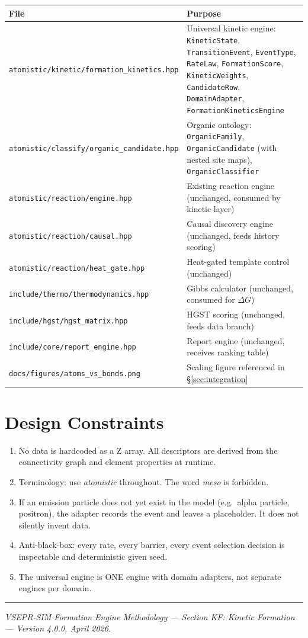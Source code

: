 \documentclass[11pt]{article}
\begin{document}
\begin{center}
\begin{tabular}{lp{7.5cm}}
\toprule
File & Purpose \\
\midrule
\texttt{atomistic/kinetic/formation\_kinetics.hpp} &
  Universal kinetic engine: \texttt{KineticState},
  \texttt{TransitionEvent}, \texttt{EventType},
  \texttt{RateLaw}, \texttt{FormationScore},
  \texttt{KineticWeights}, \texttt{CandidateRow},
  \texttt{DomainAdapter}, \texttt{FormationKineticsEngine} \\
\texttt{atomistic/classify/organic\_candidate.hpp} &
  Organic ontology: \texttt{OrganicFamily},
  \texttt{OrganicCandidate} (with nested site maps),
  \texttt{OrganicClassifier} \\
\texttt{atomistic/reaction/engine.hpp} &
  Existing reaction engine (unchanged, consumed by kinetic layer) \\
\texttt{atomistic/reaction/causal.hpp} &
  Causal discovery engine (unchanged, feeds history scoring) \\
\texttt{atomistic/reaction/heat\_gate.hpp} &
  Heat-gated template control (unchanged) \\
\texttt{include/thermo/thermodynamics.hpp} &
  Gibbs calculator (unchanged, consumed for $\Delta G$) \\
\texttt{include/hgst/hgst\_matrix.hpp} &
  HGST scoring (unchanged, feeds data branch) \\
\texttt{include/core/report\_engine.hpp} &
  Report engine (unchanged, receives ranking table) \\
\texttt{docs/figures/atoms\_vs\_bonds.png} &
  Scaling figure referenced in \S\ref{sec:integration} \\
\bottomrule
\end{tabular}
\end{center}

\section{Design Constraints}
\label{sec:constraints}

\begin{enumerate}[leftmargin=2em]
  \item No data is hardcoded as a Z array.
        All descriptors are derived from the connectivity graph and
        element properties at runtime.
  \item Terminology: use \emph{atomistic} throughout.
        The word \emph{meso} is forbidden.
  \item If an emission particle does not yet exist in the model
        (e.g.\ alpha particle, positron), the adapter records the event
        and leaves a placeholder.  It does not silently invent data.
  \item Anti-black-box: every rate, every barrier, every event selection
        decision is inspectable and deterministic given seed.
  \item The universal engine is ONE engine with domain adapters,
        not separate engines per domain.
\end{enumerate}

\vspace{2em}
\hrule
\vspace{0.5em}
{\small\itshape
VSEPR-SIM Formation Engine Methodology ---
Section KF: Kinetic Formation ---
Version 4.0.0, April 2026.}
\end{document}

